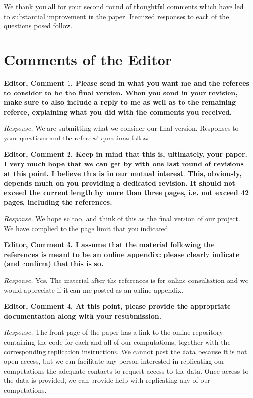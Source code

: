 \restoregeometry
\doublespacing

\noindent We thank you all for your second round of thoughtful comments which have led to substantial improvement in the paper. Itemized responses to each of the questions posed follow.

\section*{Comments of the Editor}

\noindent \textbf{Editor, Comment 1. Please send in what you want me and the referees to consider to be the final version. When you send in your revision, make sure to also include a reply to me as well as to the remaining referee, explaining what you did with the comments you received.} 

\noindent \textit{Response.} We are submitting what we consider our final version. Responses to your questions and the referees' questions follow. 

\noindent \textbf{Editor, Comment 2. Keep in mind that this is, ultimately, your paper. I very much hope that we can get by with one last round of revisions at this point. I believe this is in our mutual interest. This, obviously, depends much on you providing a dedicated revision. It should not exceed the current length by more than three pages, i.e. not exceed 42 pages, including the references.}

\noindent \textit{Response.} We hope so too, and think of this as the final version of our project. We have complied to the page limit that you indicated.

\noindent \textbf{Editor, Comment 3. I assume that the material following the references is meant to be an online appendix: please clearly indicate (and confirm) that this is so.}

\noindent \textit{Response.} Yes. The material after the references is for online consultation and we would appreciate if it can me posted as an online appendix.

\noindent \textbf{Editor, Comment 4. At this point, please provide the appropriate documentation along with your resubmission.}

\noindent \textit{Response.} The front page of the paper has a link to the online repository containing the code for each and all of our computations, together with the corresponding replication instructions. We cannot post the data because it is not open access, but we can facilitate any person interested in replicating our computations the adequate contacts to request access to the data. Once access to the data is provided, we can provide help with replicating any of our computations.

